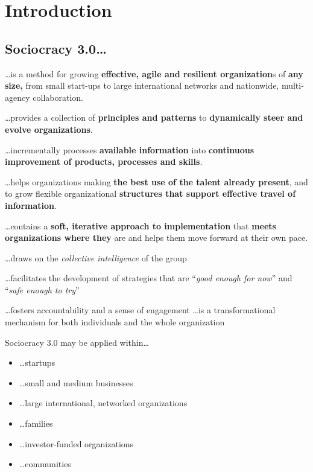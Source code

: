 \part{Introduction}
\label{introduction}

\chapter{Sociocracy 3.0{\ldots}}
\label{sociocracy3.0...}

{\ldots}is a method for growing \textbf{effective, agile and resilient organization}s of \textbf{any size,} from small start-ups to large international networks and nationwide, multi-agency collaboration.

{\ldots}provides a collection of \textbf{principles and patterns} to \textbf{dynamically steer and evolve organizations}.

{\ldots}incrementally processes \textbf{available information} into \textbf{continuous improvement of products, processes and skills}.

{\ldots}helps organizations making \textbf{the best use of the talent already present}, and to grow flexible organizational \textbf{structures that support effective travel of information}.

{\ldots}contains a \textbf{soft, iterative approach to implementation} that \textbf{meets organizations where they} are and helps them move forward at their own pace.

{\ldots}draws on the \emph{collective intelligence} of the group

{\ldots}facilitates the development of strategies that are “\emph{good enough for now}” and “\emph{safe enough to try}”

{\ldots}fosters accountability and a sense of engagement
{\ldots}is a transformational mechanism for both individuals and the whole organization

Sociocracy 3.0 may be applied within{\ldots}

\begin{itemize}
\item {\ldots}startups

\item {\ldots}small and medium businesses

\item {\ldots}large international, networked organizations

\item {\ldots}families

\item {\ldots}investor-funded organizations

\item {\ldots}communities

\end{itemize}

